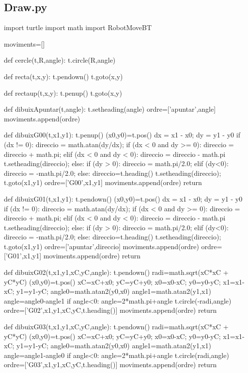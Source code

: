 \newpage

\subsection{Draw.py}
\begin{python}
	import turtle
	import math
	import RobotMoveBT
	
	moviments=[]
	
	def cercle(t,R,angle):
		t.circle(R,angle)
	
	def recta(t,x,y):
		t.pendown()
		t.goto(x,y)
		
	def rectaup(t,x,y):
		t.penup()
		t.goto(x,y)
		
	def dibuixApuntar(t,angle):
		t.setheading(angle)
		ordre=['apuntar',angle]
		moviments.append(ordre)
	
	def dibuixG00(t,x1,y1):
		t.penup()
		(x0,y0)=t.pos()
		dx = x1 - x0;
		dy = y1 - y0
		if (dx != 0):
			direccio = math.atan(dy/dx);
			if (dx < 0 and dy >= 0):
				direccio = direccio + math.pi;
			elif (dx < 0 and dy < 0):
				direccio = direccio - math.pi
			t.setheading(direccio);
		else:
			if (dy > 0):
				direccio = math.pi/2.0;
			elif (dy<0):
				direccio = -math.pi/2.0;
			else:
				direccio=t.heading()
			t.setheading(direccio);
		t.goto(x1,y1)
		ordre=['G00',x1,y1]
		moviments.append(ordre)
		return
	
	def dibuixG01(t,x1,y1):
		t.pendown()
		(x0,y0)=t.pos()
		dx = x1 - x0;
		dy = y1 - y0
		if (dx != 0):
			direccio = math.atan(dy/dx);
			if (dx < 0 and dy >= 0):
				direccio = direccio + math.pi;
			elif (dx < 0 and dy < 0):
				direccio = direccio - math.pi
			t.setheading(direccio);
		else:
			if (dy > 0):
				direccio = math.pi/2.0;
			elif (dy<0):
				direccio = -math.pi/2.0;
			else:
				direccio=t.heading()
			t.setheading(direccio);
		t.goto(x1,y1)
		ordre=['apuntar',direccio]
		moviments.append(ordre)
		ordre=['G01',x1,y1]
		moviments.append(ordre)
		return
	
	
	def dibuixG02(t,x1,y1,xC,yC,angle):
		t.pendown()
		radi=math.sqrt(xC*xC + yC*yC)
		(x0,y0)=t.pos()
		xC=xC+x0;
		yC=yC+y0;
		x0=x0-xC;
		y0=y0-yC;
		x1=x1-xC;
		y1=y1-yC;
		angle0=math.atan2(y0,x0)
		angle1=math.atan2(y1,x1)
		angle=angle0-angle1
		if angle<0:
			angle=2*math.pi+angle
		t.circle(-radi,angle)
		ordre=['G02',x1,y1,xC,yC,t.heading()]
		moviments.append(ordre)
		return
	
	def dibuixG03(t,x1,y1,xC,yC,angle):
		t.pendown()
		radi=math.sqrt(xC*xC + yC*yC)
		(x0,y0)=t.pos()
		xC=xC+x0;
		yC=yC+y0;
		x0=x0-xC;
		y0=y0-yC;
		x1=x1-xC;
		y1=y1-yC;
		angle0=math.atan2(y0,x0)
		angle1=math.atan2(y1,x1)
		angle=angle1-angle0
		if angle<0:
			angle=2*math.pi+angle
		t.circle(radi,angle)
		ordre=['G03',x1,y1,xC,yC,t.heading()]
		moviments.append(ordre)
		return
	

\end{python}
